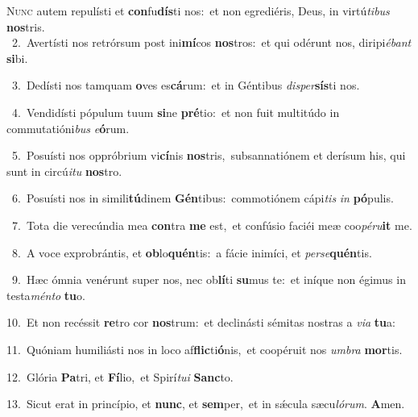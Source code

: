 \lettrine{\initial\textcolor{\initialcolor}{N}}{unc} autem repulísti et \textbf{con}\-fu\-\textbf{dís}\-ti nos:~\star et non egrediéris, Deus, in virtú\-\textit{ti}\-\textit{bus} \textbf{nos}\-tris.\\
{\numbfont\textcolor{\numbcolor}{~2.}}~Avertísti nos retrórsum post ini\-\textbf{mí}\-cos \textbf{nos}\-tros:~\star et qui odérunt nos, diripi\-\textit{é}\-\textit{bant} \textbf{si}\-bi.\par
{\numbfont\textcolor{\numbcolor}{~3.}}~Dedísti nos tamquam \textbf{o}\-ves es\-\textbf{cá}\-rum:~\star et in Géntibus \textit{di}\-\textit{sper}\textbf{sís}ti nos.\par
{\numbfont\textcolor{\numbcolor}{~4.}}~Vendidísti pópulum tuum \textbf{si}\-ne \textbf{pré}\-tio:~\star et non fuit multitúdo in commutatióni\textit{bus} \textit{e}\-\textbf{ó}rum.\par
{\numbfont\textcolor{\numbcolor}{~5.}}~Posuísti nos oppróbrium vi\-\textbf{cí}\-nis \textbf{nos}\-tris,~\star subsannatiónem et derísum his, qui sunt in circú\-\textit{i}\-\textit{tu} \textbf{nos}\-tro.\par
{\numbfont\textcolor{\numbcolor}{~6.}}~Posuísti nos in simili\-\textbf{tú}\-dinem \textbf{Gén}\-tibus:~\star commotiónem cápi\textit{tis} \textit{in} \textbf{pó}\-pulis.\par
{\numbfont\textcolor{\numbcolor}{~7.}}~Tota die verecúndia mea \textbf{con}\-tra \textbf{me} est,~\star et confúsio faciéi meæ coo\-\textit{pé}\-\textit{ru}\textbf{it} me.\par
{\numbfont\textcolor{\numbcolor}{~8.}}~A voce exprobrántis, et \textbf{ob}\-lo\-\textbf{quén}\-tis:~\star a fácie inimíci, et \textit{per}\-\textit{se}\textbf{quén}tis.\par
{\numbfont\textcolor{\numbcolor}{~9.}}~Hæc ómnia venérunt super nos, nec ob\-\textbf{lí}\-ti \textbf{su}\-mus te:~\star et iníque non égimus in testa\-\textit{mén}\-\textit{to} \textbf{tu}\-o.\par
{\numbfont\textcolor{\numbcolor}{10.}}~Et non recéssit \textbf{re}\-tro cor \textbf{nos}\-trum:~\star et declinásti sémitas nostras a \textit{vi}\-\textit{a} \textbf{tu}\-a:\par
{\numbfont\textcolor{\numbcolor}{11.}}~Quóniam humiliásti nos in loco af\-\textbf{flic}\-ti\-\textbf{ó}\-nis,~\star et coopéruit nos \textit{um}\-\textit{bra} \textbf{mor}\-tis.\par
{\numbfont\textcolor{\numbcolor}{12.}}~Glória \textbf{Pa}\-tri, et \textbf{Fí}\-lio,~\star et Spirí\-\textit{tu}\-\textit{i} \textbf{Sanc}\-to.\par
{\numbfont\textcolor{\numbcolor}{13.}}~Sicut erat in princípio, et \textbf{nunc}\-, et \textbf{sem}\-per,~\star et in sǽcula sæcu\-\textit{ló}\-\textit{rum}. \textbf{A}\-men.\par
